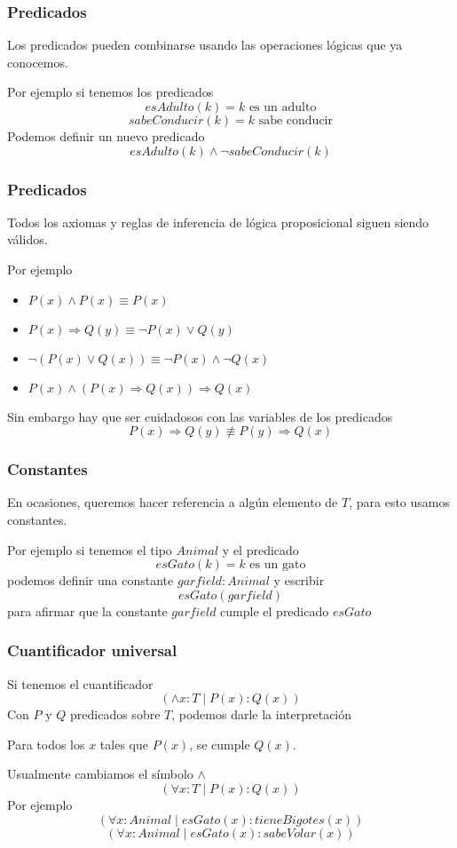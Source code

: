 \documentclass{beamer}
\newcommand{\then}{\Rightarrow}
\begin{document}
\begin{frame}[fragile]
    \frametitle{Predicados}
        \pause
        Los predicados pueden combinarse usando las operaciones lógicas que ya conocemos.
        \pause

        Por ejemplo si tenemos los predicados
        \pause
        $$esAdulto(k) = k\text{ es un adulto}$$
        \pause
        $$sabeConducir(k) = k\text{ sabe conducir}$$
        \pause
        Podemos definir un nuevo predicado
        \pause
        $$esAdulto(k) \land \lnot sabeConducir(k)$$
\end{frame}
\begin{frame}[fragile]
    \frametitle{Predicados}
        \pause
        Todos los axiomas y reglas de inferencia de lógica proposicional siguen siendo válidos.
        \pause

        Por ejemplo
        \begin{itemize}
            \pause
            \item $P(x) \land P(x) \equiv P(x)$
            \pause
            \item $P(x) \then Q(y) \equiv \lnot P(x) \lor Q(y)$
            \pause
            \item $\lnot(P(x) \lor Q(x)) \equiv \lnot P(x) \land \lnot Q(x)$
            \pause
            \item $P(x) \land (P(x) \then Q(x)) \then Q(x)$
        \end{itemize}
        \pause
        Sin embargo hay que ser cuidadosos con las variables de los predicados
        \pause
        $$P(x) \then Q(y) \not \equiv P(y) \then Q(x)$$
\end{frame}

\begin{frame}[fragile]
    \frametitle{Constantes}
        \pause
        En ocasiones, queremos hacer referencia a algún elemento de $T$, para esto usamos constantes.
        \pause

        Por ejemplo si tenemos el tipo $Animal$ y el predicado
        \pause
        $$esGato(k) = k\text{ es un gato}$$
        \pause
        podemos definir una constante $garfield: Animal$ y escribir
        \pause
        $$esGato(garfield)$$
        \pause
        para afirmar que la constante $garfield$ cumple el predicado $esGato$
\end{frame}

\begin{frame}[fragile]
    \frametitle{Cuantificador universal}
        \pause
        Si tenemos el cuantificador 
        $$(\land x:T \mid P(x) : Q(x))$$
        \pause
        Con $P$ y $Q$ predicados sobre $T$, podemos darle la interpretación
        \pause
        \begin{center}
            Para todos los $x$ tales que $P(x)$, se cumple $Q(x)$.
        \end{center}
        \pause
        Usualmente cambiamos el símbolo $\land$
        $$(\forall x:T \mid P(x) : Q(x))$$
        \pause
        Por ejemplo
        \pause
        $$(\forall x:Animal \mid esGato(x) : tieneBigotes(x))$$
        \pause
        $$(\forall x:Animal \mid esGato(x) : sabeVolar(x))$$
\end{frame}
\end{document}
